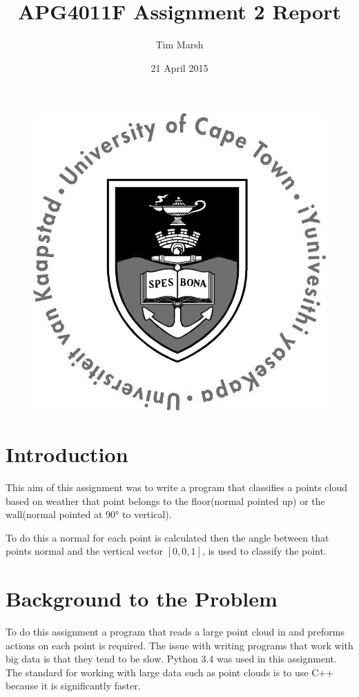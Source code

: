 \documentclass[11pt,a4paper]{article}
\title{APG4011F Assignment 2 Report}
\date{21 April 2015}
\author{Tim Marsh}
\begin{document}
	
	\maketitle
	\begin{figure}[H]
		\centering
		\includegraphics[width=0.7\linewidth]{./UCTcircular_logo1_CMYK}
		\label{fig:UCTcircular_logo1_CMYK}
	\end{figure}
	\newpage
	\tableofcontents
	\listoffigures
	\newpage
	
	
	\section{Introduction}
	
	This aim of this assignment was to write a program that classifies a points cloud based on weather that point belongs to the floor(normal pointed up) or the wall(normal pointed at 90\si{\degree} to vertical).
	
	To do this a normal for each point is calculated then the angle between that points normal and the vertical vector $[0,0,1]$, is used to classify the point. 

	\section{Background to the Problem}
	
	To do this assignment a program that reads a large point cloud in and preforms actions on each point is required. The issue with writing programs that work with big data is that they tend to be slow. Python 3.4 was used in this assignment. The standard for working with large data such as point clouds is to use C++ because it is significantly faster.
	
\end{document}
